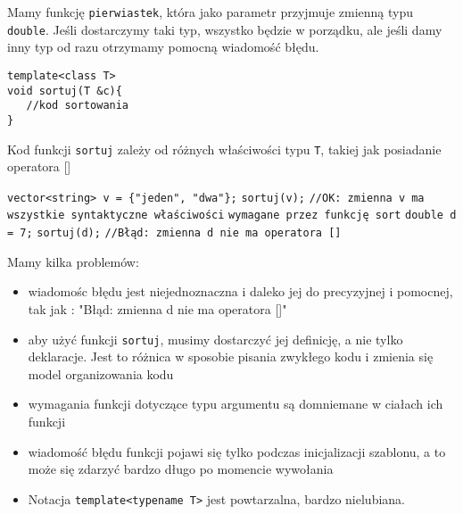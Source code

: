 \documentclass[11pt, a4paper]{article}
\begin{document}
Mamy funkcję \verb#pierwiastek#, która jako parametr przyjmuje zmienną typu \verb#double#. Jeśli dostarczymy taki typ, wszystko będzie w porządku, ale jeśli damy inny typ od razu otrzymamy pomocną wiadomość błędu.

\begin{lstlisting}[frame=single]
template<class T>
void sortuj(T &c){
   //kod sortowania
}
\end{lstlisting}

Kod funkcji \verb#sortuj# zależy od różnych właściwości typu \verb#T#, takiej jak posiadanie operatora [] \newline

\noindent \verb#vector<string> v = {"jeden", "dwa"};# \newline
\verb#sortuj(v);# \newline
\verb#//OK: zmienna v ma wszystkie syntaktyczne właściwości# \newline
\verb#wymagane przez funkcję sort# \newline\newline
\verb#double d = 7;# \newline
\verb#sortuj(d);# \newline
\verb#//Błąd: zmienna d nie ma operatora []#\newline

\noindent Mamy kilka problemów:\newline
\begin{itemize}

\item wiadomośc błędu jest niejednoznaczna i daleko jej do precyzyjnej i pomocnej, tak jak : "Błąd: zmienna d nie ma operatora []"

\item aby użyć funkcji \verb#sortuj#, musimy dostarczyć jej definicję, a nie tylko deklaracje. Jest to różnica w sposobie pisania zwykłego kodu i zmienia się model organizowania kodu

\item wymagania funkcji dotyczące typu argumentu są domniemane w ciałach ich funkcji

\item wiadomość błędu funkcji pojawi się tylko podczas inicjalizacji szablonu, a to może się zdarzyć bardzo długo po momencie wywołania

\item Notacja \verb#template<typename T># jest powtarzalna, bardzo nielubiana.

\end{itemize}
\end{document}
